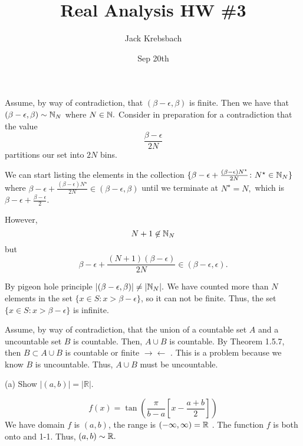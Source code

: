 \documentclass{report}
\title{Real Analysis HW \#3}
\author{Jack Krebsbach }
\date{Sep 20th}
\newcommand{\contra}{
$\rightarrow\!\leftarrow$
}
\begin{document}
\maketitle


\sol
\begin{myproof}
    
Assume, by way of contradiction, that $(\beta - \epsilon, \beta)$ is finite. Then we have that $(\beta - \epsilon,\beta) \sim \NN_{N}$ where $N \in \NN.$ Consider in preparation for a contradiction that  the value $$\frac{\beta - \epsilon}{2N}$$ partitions our set into $2N$ bins.

We can start listing the elements in the collection $\{\beta - \epsilon + \frac{(\beta - \epsilon)N^\star}{2N} \colon  N^\star \in \NN_N\}$ where $ \beta - \epsilon + \frac{(\beta - \epsilon)N^\star}{2N}\in (\beta-\epsilon, \beta)$ until we terminate at $N^\star = N,$ which is $ \beta - \epsilon + \frac{\beta-\epsilon}{2}$.\par However, $$N + 1 \not\in \NN_N$$ but 
$$ \beta - \epsilon + \frac{(N+1)(\beta - \epsilon)}{2N} \in (\beta - \epsilon, \epsilon).$$

By pigeon hole principle $|(\beta-\epsilon, \beta)| \neq |\NN_{N}|.$ We have counted more than $N$ elements in the set $\{x \in S: x>\beta-\epsilon\}$, so it can not be finite. Thus, the set $\{x \in S: x>\beta-\epsilon\}$ is infinite.

\end{myproof}
\begin{myproof}
  Assume, by way of contradiction, that the union of a countable set $A$ and a uncountable set $B$ is countable. Then, $A \cup B$ is countable. By Theorem 1.5.7, then $B \subset A \cup B$ is countable or finite \contra. This is a problem because we know $B$ is uncountable. Thus, $A \cup B$ must be uncountable. 

  
\end{myproof}

(a) Show $|(a, b)|=|\mathbb{R}|$. 


\sol
$$
f(x) = \tan\left(\frac{\pi}{b-a}\left[x - \frac{a+b}{2}\right]\right)
$$
We have domain $f$ is $(a,b)$, the range is $(-\infty, \infty) = \RR$ . The function $f$ is both onto and 1-1. Thus, $(a,b) \sim \RR.$
\end{document}
